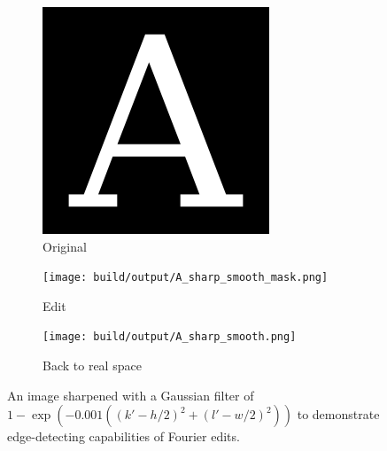 \begin{figure}
    \centering
    \begin{subfigure}[h]{.32\linewidth}
        \centering
        \includegraphics[width=.9\linewidth]{images/A.png}
        \caption{Original }
    \end{subfigure}
    \begin{subfigure}[h]{.32\linewidth}
        \centering
        \texttt{[image: build/output/A\_sharp\_smooth\_mask.png]}
        \caption{Edit}
    \end{subfigure}
    \begin{subfigure}[h]{.32\linewidth}
        \centering
        \texttt{[image: build/output/A\_sharp\_smooth.png]}
        \caption{Back to real space}
    \end{subfigure}
    \caption{An image sharpened with a Gaussian filter of $1-\exp(-0.001 ((k'-h/2)^2+(l'-w/2)^2))$ to demonstrate edge-detecting capabilities of Fourier edits.}
    \label{fig:edges}
\end{figure}
\FloatBarrier


